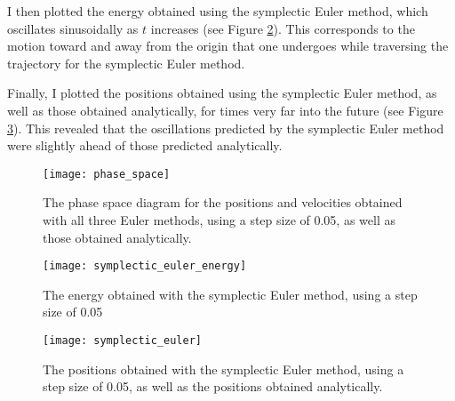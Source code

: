 \documentclass[11pt]{article}
\begin{document}
I then plotted the energy obtained using the symplectic Euler method, which oscillates sinusoidally as $t$ increases (see Figure \ref{fig:energy2}). This corresponds to the motion toward and away from the origin that one undergoes while traversing the trajectory for the symplectic Euler method.

Finally, I plotted the positions obtained using the symplectic Euler method, as well as those obtained analytically, for times very far into the future (see Figure \ref{fig:positionsAndVelocities2}). This revealed that the oscillations predicted by the symplectic Euler method were slightly ahead of those predicted analytically.

\begin{figure}[H]
\texttt{[image: phase\_space]}\\
\caption{The phase space diagram for the positions and velocities obtained with all three Euler methods, using a step size of 0.05, as well as those obtained analytically.}
\label{fig:phaseSpace}
\end{figure}

\vfill

\begin{figure}[H]
\texttt{[image: symplectic\_euler\_energy]}\\
\caption{The energy obtained with the symplectic Euler method, using a step size of 0.05}
\label{fig:energy2}
\end{figure}

\begin{figure}[H]
\texttt{[image: symplectic\_euler]}\\
\caption{The positions obtained with the symplectic Euler method, using a step size of 0.05, as well as the positions obtained analytically.}
\label{fig:positionsAndVelocities2}
\end{figure}
\end{document}

